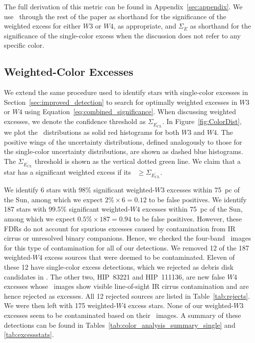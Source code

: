\noindent The full derivation of this metric can be found in Appendix~\ref{sec:appendix}. We use \ES\ through the rest of the paper as shorthand for the significance of the weighted excess for either $W3$ or $W4$, as appropriate, and $\Sigma_{E}$ as shorthand for the significance of the single-color excess when the discussion does not refer to any specific color.


    \subsection{Weighted-Color Excesses}
    \label{sec:weighted_excesses_results}
    
    We extend the same procedure used to identify stars with single-color excesses in Section~\ref{sec:improved_detection} to search for optimally weighted excesses in $W3$ or $W4$ using Equation~\ref{eq:combined_significance}. When discussing weighted excesses, we denote the confidence threshold as $\Sigma_{\overline{E_{CL}}}$. In Figure~\ref{fig:ColorDist}, we plot the \ES\ distributions as solid red histograms for both $W3$ and $W4$. The positive wings of the uncertainty distributions, defined analogously to those for the single-color uncertainty distributions, are shown as dashed blue histograms. The $\Sigma_{\overline{E_{CL}}}$ threshold is shown as the vertical dotted green line. We claim that a star has a significant weighted excess if its \ES\ $\geq \Sigma_{\overline{E_{CL}}}$.
    
    We identify 6 stars with 98\% significant weighted-$W3$ excesses within 75~pc of the Sun, among which we expect $2\% \times 6 = 0.12$ to be false positives. We identify 187 stars with 99.5\% significant weighted-$W4$ excesses within 75~pc of the Sun, among which we expect $0.5\% \times 187 = 0.94$ to be false positives. However, these FDRs do not account for spurious excesses caused by contamination from IR cirrus or unresolved binary companions. Hence, we checked the four-band \WS\ images for this type of contamination for all of our detections. We removed 12 of the 187 weighted-$W4$ excess sources that were deemed to be contaminated. Eleven of these 12 have single-color excess detections, which we rejected as debris disk candidates in .  The other two, HIP~83221 and HIP~111136, are new false $W4$ excesses whose \WS\ images show visible line-of-sight IR cirrus contamination and are hence rejected as excesses. All 12 rejected sources are listed in Table~\ref{tab:rejects}. We were then left with 175 weighted-$W4$ excess stars. None of our weighted-$W3$ excesses seem to be contaminated based on their \WS\ images. A summary of these detections can be found in Tables~\ref{tab:color_analysis_summary_single} and \ref{tab:excessstats}.
    
